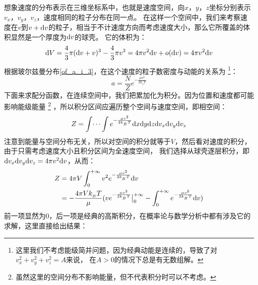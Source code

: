         \begin{prove}            
            想象速度的分布表示在三维坐标系中，也就是速度空间，向$x$，$y$，$z$坐标分别表示$v_x$，$v_y$，$v_z$，速度相同的粒子分布在同一点。
            在这样一个空间中，我们来考察速度在$v$到$v+\mathrm{d}{v}$的粒子，相当于不计速度方向而考虑速度大小，那么它所覆盖的体积显然是一个厚度为$\mathrm{d}{v}$的球壳。
            它的体积为：
            \begin{equation}
                \mathrm{d}{V} = \frac{4}{3}\pi (\mathrm{d}{v}+v)^{3} - \frac{4}{3}\pi v^{3} = 4\pi v^{2}\mathrm{d}{v} + o(\mathrm{d}{v}) = 4\pi v^{2}\mathrm{d}{v}
            \end{equation}
            根据玻尔兹曼分布\ref{of_a_i_3}，在这个速度的粒子数密度与动能的关系为
            \footnote{这里我们不考虑能级简并问题，因为经典动能是连续的，导致了对$v_{x}^{2}+v_{y}^{2}+v_{z}^{2}=A$来说，
            在$A>0$的情况下总是有无数组解。}：
            \begin{equation}
                a= \frac{N}{Z} e^{-\frac{\mu v^{2}}{2k_{_B}T}}
            \end{equation}
            下面来求配分函数，在连续空间中，我们把累加化为积分。因为位置和速度都可能影响能级能量
            \footnote{虽然这里的空间分布不影响能量，但不代表积分时可以不考虑。}
            ，所以积分区间应遍历整个空间与速度空间，即相空间：
            \begin{equation}
                Z =\int \dots \int e^{-\frac{\mu v^{2}}{2k_{_B}T}} \mathrm{d}{x}\mathrm{d}{y}\mathrm{d}{z}\mathrm{d}{v_x}\mathrm{d}{v_y}\mathrm{d}{v_z}
            \end{equation}
            注意到能量与空间分布无关，所以对空间的积分就等于$V$，然后看对速度的积分，由于只需考虑速度大小且积分区间为全速度空间，
            我们选择从球壳逐层积分，即$\mathrm{d}{v_x}\mathrm{d}{v_y}\mathrm{d}{v_z} = 4\pi v^{2}\mathrm{d}{v}$，从而：
            \begin{equation}
                \begin{aligned}
                    Z &= 4\pi V\int_{0}^{+\infty} v^{2} e^{-\frac{\mu v^{2}}{2k_{_B}T}} \mathrm{d}{v}\\
                      &= -\frac{4 \pi V k_{_B}T}{\mu} (ve^{-\frac{\mu v^{2}}{2k_{_B}T}}\big|_{0}^{+\infty} - \int_{0}^{+\infty} e^{-\frac{\mu v^{2}}{2k_{_B}T}} \mathrm{d}{v})
                \end{aligned}
            \end{equation}
            前一项显然为0，后一项是经典的高斯积分，在概率论与数学分析中都有涉及它的求解，这里直接给出结果：
            \begin{equation}

\end{equation}
\end{prove}
